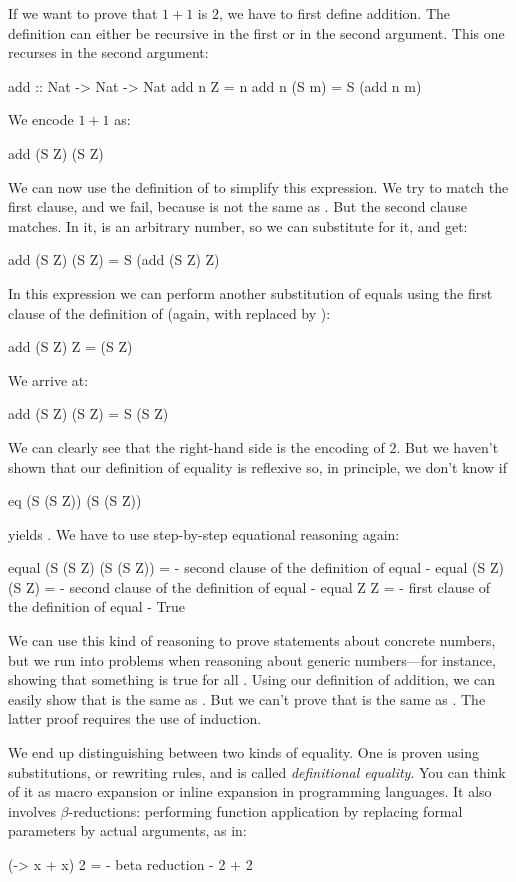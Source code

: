 \documentclass[DaoFP]{subfiles}
\begin{document}
If we want to prove that $1+1$ is $2$, we have to first define addition. The definition can either be recursive in the first or in the second argument. This one recurses in the second argument:
\begin{haskell}
add :: Nat -> Nat -> Nat
add n Z = n
add n (S m) = S (add n m)
\end{haskell}
We encode $1 + 1$ as:
\begin{haskell}
add (S Z) (S Z)
\end{haskell}
We can now use the definition of  to simplify this expression. We try to match the first clause, and we fail, because  is not the same as . But the second clause matches. In it,  is an arbitrary number, so we can substitute  for it, and get:
\begin{haskell}
add (S Z) (S Z) = S (add (S Z) Z)
\end{haskell}
In this expression we can perform another substitution of equals using the first clause of the definition of  (again, with  replaced by ):
\begin{haskell}
add (S Z) Z = (S Z)
\end{haskell}
We arrive at:
\begin{haskell}
add (S Z) (S Z) = S (S Z)
\end{haskell}
We can clearly see that the right-hand side is the encoding of $2$. But we haven't shown that our definition of equality is reflexive so, in principle, we don't know if
\begin{haskell}
eq (S (S Z)) (S (S Z))
\end{haskell}
yields . We have to use step-by-step equational reasoning again:
\begin{haskell}
equal (S (S Z) (S (S Z)) =
{- second clause of the definition of equal -}
equal (S Z) (S Z) =
{- second clause of the definition of equal -}
equal Z Z =
{- first clause of the definition of equal -}
True
\end{haskell}

We can use this kind of reasoning to prove statements about concrete numbers, but we run into problems when reasoning about generic numbers---for instance, showing that something is true for all . Using our definition of addition, we can easily show that  is the same as . But we can't prove that  is the same as . The latter proof requires the use of induction. 

We end up distinguishing between two kinds of equality. One is proven using substitutions, or rewriting rules, and is called \emph{definitional equality}. You can think of it as macro expansion or inline expansion in programming languages. It also involves $\beta$-reductions: performing function application by replacing formal parameters by actual arguments, as in:
\begin{haskell}
(\x -> x + x) 2 =
{- beta reduction -}
2 + 2
\end{haskell}
\end{document}
